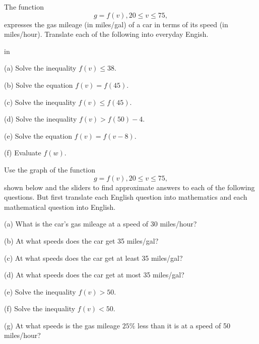 \documentclass{ximera}
\newcommand{\pskip}{\vskip 0.1 in}
\begin{document}
\begin{example}  \label{ExFun2}

The function
\[
   g = f(v) , 20 \leq v \leq 75 ,
\]
expresses the gas mileage (in miles/gal) of a car in terms of its speed (in miles/hour). Translate each of the following into everyday Engish.

\pskip

\noindent (a) Solve the inequality $f(v)\leq 38$.

\noindent (b) Solve the equation $f(v) = f(45)$.

\noindent (c) Solve the inequality $f(v) \leq f(45)$.

\noindent (d) Solve the inequality $f(v)> f(50)-4$.

\noindent (e) Solve the equation $f(v)=f(v-8)$.

\noindent (f) Evaluate $f(w)$.

\end{example}


\begin{example}  \label{ExFun3}
Use the graph of the function 
\[
    g = f(v) , 20\leq v \leq 75 ,
\]
shown below and the sliders to find approximate answers to each of the following questions. But first translate each English question into mathematics and each mathematical question into English.

(a) What is the car's gas mileage at a speed of 30 miles/hour?

(b) At what speeds does the car get 35 miles/gal?

(c)  At what speeds does the car get at least 35 miles/gal?

(d)  At what speeds does the car get at most 35 miles/gal?

(e) Solve the inequality $f(v)> 50$.

(f) Solve the inequality $f(v)<50$.

(g) At what speeds is the gas mileage $25\%$ less than it is at a speed of 50 miles/hour?



\begin{exploration}\label{exp:Fun3}


 
\begin{onlineOnly}
    \begin{center}
\end{center}
\end{onlineOnly}
\end{exploration}



\end{example}
\end{document}
